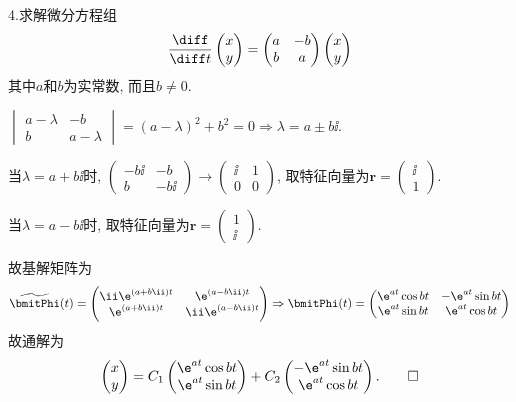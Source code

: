 4.求解微分方程组
\[\frac{\diff}{\diff t}\begin{pmatrix}x\\y\end{pmatrix}=\begin{pmatrix}a&-b\\b&a\end{pmatrix}\begin{pmatrix}x\\y\end{pmatrix}\]
其中$a$和$b$为实常数, 而且$b\neq0$.

\begin{solve}
$\begin{vmatrix}a-\lambda&-b\\b&a-\lambda\end{vmatrix}=(a-\lambda)^2+b^2=0\Rightarrow\lambda=a\pm b\ii$.

当$\lambda=a+b\ii$时, $\begin{pmatrix}-b\ii&-b\\b&-b\ii\end{pmatrix}\to\begin{pmatrix}\ii&1\\0&0\end{pmatrix}$, 
取特征向量为$\bm{r}=\begin{pmatrix}\ii\\1\end{pmatrix}$.

当$\lambda=a-b\ii$时, 取特征向量为$\bm{r}=\begin{pmatrix}1\\\ii\end{pmatrix}$.

故基解矩阵为
\[\widetilde{\bmitPhi}(t)=\begin{pmatrix}\ii\e^{(a+b\ii)t}&\e^{(a-b\ii)t}\\\e^{(a+b\ii)t}&\ii\e^{(a-b\ii)t}\end{pmatrix}\Rightarrow\bmitPhi(t)=\begin{pmatrix}\e^{at}\cos bt&-\e^{at}\sin bt\\ \e^{at}\sin bt&\e^{at}\cos bt\end{pmatrix}\]
故通解为
\[\begin{pmatrix}x\\y\end{pmatrix}=C_1\begin{pmatrix}\e^{at}\cos bt\\\e^{at}\sin bt\end{pmatrix}+C_2\begin{pmatrix}-\e^{at}\sin bt\\\e^{at}\cos bt\end{pmatrix}.\qedhere\]
\end{solve}



